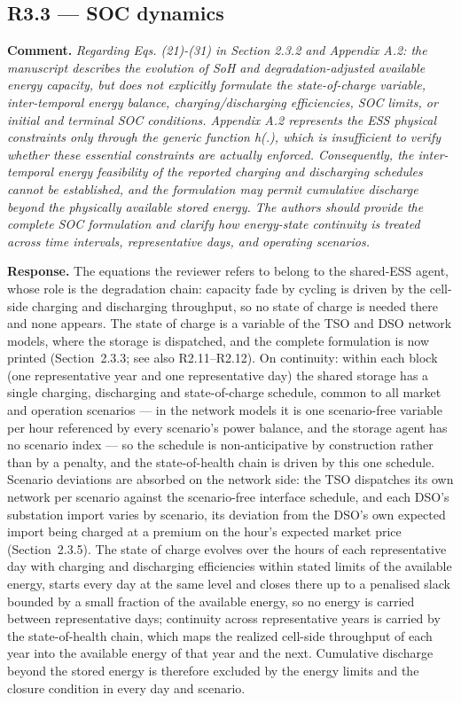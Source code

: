 \documentclass[11pt]{article}
\newcommand{\rcomment}[1]{\par\medskip\noindent\textbf{Comment.} \textit{#1}\par\smallskip}
\newcommand{\rresponse}[1]{\noindent\textbf{Response.} #1\par\smallskip}
\begin{document}
\subsection*{R3.3 --- SOC dynamics}
\rcomment{
Regarding Eqs. (21)-(31) in Section 2.3.2 and Appendix A.2: the manuscript describes the evolution of SoH and degradation-adjusted available energy capacity, but does not explicitly formulate the state-of-charge variable, inter-temporal energy balance, charging/discharging efficiencies, SOC limits, or initial and terminal SOC conditions. Appendix A.2 represents the ESS physical constraints only through the generic function h(.), which is insufficient to verify whether these essential constraints are actually enforced. Consequently, the inter-temporal energy feasibility of the reported charging and discharging schedules cannot be established, and the formulation may permit cumulative discharge beyond the physically available stored energy. The authors should provide the complete SOC formulation and clarify how energy-state continuity is treated across time intervals, representative days, and operating scenarios.
}
\rresponse{The equations the reviewer refers to belong to the shared-ESS agent, whose role is the degradation chain: capacity fade by cycling is driven by the cell-side charging and discharging throughput, so no state of charge is needed there and none appears. The state of charge is a variable of the TSO and DSO network models, where the storage is dispatched, and the complete formulation is now printed (Section~2.3.3; see also R2.11--R2.12). On continuity: within each block (one representative year and one representative day) the shared storage has a single charging, discharging and state-of-charge schedule, common to all market and operation scenarios --- in the network models it is one scenario-free variable per hour referenced by every scenario's power balance, and the storage agent has no scenario index --- so the schedule is non-anticipative by construction rather than by a penalty, and the state-of-health chain is driven by this one schedule. Scenario deviations are absorbed on the network side: the TSO dispatches its own network per scenario against the scenario-free interface schedule, and each DSO's substation import varies by scenario, its deviation from the DSO's own expected import being charged at a premium on the hour's expected market price (Section~2.3.5). The state of charge evolves over the hours of each representative day with charging and discharging efficiencies within stated limits of the available energy, starts every day at the same level and closes there up to a penalised slack bounded by a small fraction of the available energy, so no energy is carried between representative days; continuity across representative years is carried by the state-of-health chain, which maps the realized cell-side throughput of each year into the available energy of that year and the next. Cumulative discharge beyond the stored energy is therefore excluded by the energy limits and the closure condition in every day and scenario.}
\end{document}
